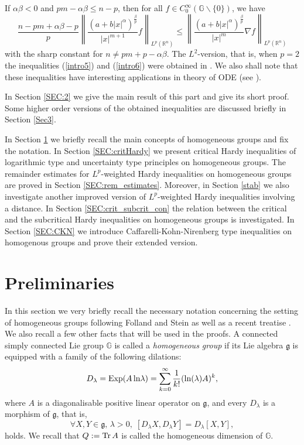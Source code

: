 \documentclass[a4paper,12pt,reqno]{amsart}
\renewcommand\eqref[1]{(\ref{#1})} %
\numberwithin{equation}{section}
\theoremstyle{plain}
\theoremstyle{definition}
\begin{document}
If $\alpha \beta<0$ and $pm-\alpha\beta\leq n-p$, then for all $f\in C_{0}^{\infty}(\mathbb{G}\backslash\{0\})$, we have
\begin{equation} \label{intro6}
\frac{n-pm+\alpha\beta-p}{p}
\left\|\frac{(a+b|x|^{\alpha})^{\frac{\beta}{p}}}{|x|^{m+1}}f\right\|_{L^{p}(\mathbb R^{n})}
\leq\left\|\frac{(a+b|x|^{\alpha})^{\frac{\beta}{p}}}{|x|^{m}}\nabla f\right\|_{L^{p}(\mathbb R^{n})}
\end{equation}
with the sharp constant for $n\neq pm+p-\alpha\beta$. The $L^{2}$-version, that is, when $p=2$ the inequalities \eqref{intro5} and \eqref{intro6} were obtained in \cite{GM11}. We also shall note that these inequalities have interesting applications in theory of ODE (see \cite[Theorem 2.1]{GM11}).

In Section \ref{SEC:2} we give the main result of this part and give its short proof. Some higher order versions of the obtained inequalities are discussed briefly in Section \ref{Sec3}.



In Section \ref{SEC:prelim} we briefly recall the main concepts of homogeneous groups and fix the notation. In Section \ref{SEC:critHardy} we present critical Hardy inequalities of logarithmic type and uncertainty type principles on homogeneous groups. The remainder estimates for $L^{p}$-weighted Hardy inequalities on homogeneous groups are proved in Section \ref{SEC:rem_estimates}. Moreover, in Section \ref{stab} we also investigate another improved version of $L^{p}$-weighted Hardy inequalities involving a distance. In Section \ref{SEC:crit_subcrit_con} the relation between the critical and the subcritical Hardy inequalities on homogeneous groups is investigated. In Section \ref{SEC:CKN} we introduce Caffarelli-Kohn-Nirenberg type inequalities on homogenous groups and prove their extended version.

\section{Preliminaries}
\label{SEC:prelim}

In this section we very briefly recall the necessary notation concerning the setting of homogeneous
groups following Folland and Stein \cite{FS-Hardy} as well as a recent treatise \cite{FR}.
We also recall a few other facts that will be used in the proofs.
A connected simply connected Lie group $\mathbb G$ is called a {\em homogeneous group} if
its Lie algebra $\mathfrak{g}$ is equipped with a family of the following dilations:
$$D_{\lambda}={\rm Exp}(A \,{\rm ln}\lambda)=\sum_{k=0}^{\infty}
\frac{1}{k!}({\rm ln}(\lambda) A)^{k},$$
where $A$ is a diagonalisable positive linear operator on $\mathfrak{g}$,
and every $D_{\lambda}$ is a morphism of $\mathfrak{g}$,
that is,
$$\forall X,Y\in \mathfrak{g},\, \lambda>0,\;
[D_{\lambda}X, D_{\lambda}Y]=D_{\lambda}[X,Y],$$
holds. We recall that $Q := {\rm Tr}\,A$ is called the homogeneous dimension of $\mathbb G$.
\end{document}
